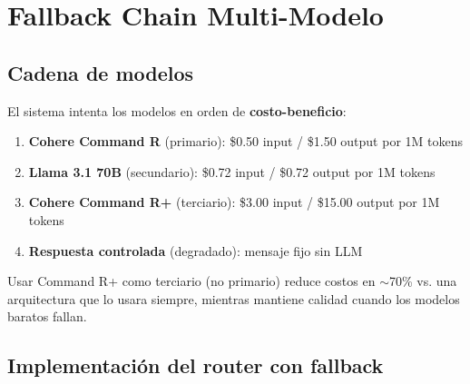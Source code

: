 \documentclass[11pt,a4paper]{article}
\begin{document}
\section{Fallback Chain Multi-Modelo}

\subsection{Cadena de modelos}

El sistema intenta los modelos en orden de \textbf{costo-beneficio}:

\begin{enumerate}[leftmargin=*]
    \item \textbf{Cohere Command R} (primario): \$0.50 input / \$1.50 output por 1M tokens
    \item \textbf{Llama 3.1 70B} (secundario): \$0.72 input / \$0.72 output por 1M tokens
    \item \textbf{Cohere Command R+} (terciario): \$3.00 input / \$15.00 output por 1M tokens
    \item \textbf{Respuesta controlada} (degradado): mensaje fijo sin LLM
\end{enumerate}

\begin{tcolorbox}[colback=success!10!white, colframe=success, title=\textbf{Decisi\'on de costos}]
Usar Command R+ como terciario (no primario) reduce costos en $\sim$70\% vs. una arquitectura que lo usara siempre, mientras mantiene calidad cuando los modelos baratos fallan.
\end{tcolorbox}

\subsection{Implementaci\'on del router con fallback}
\end{document}
